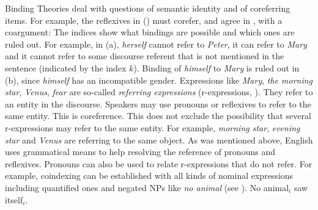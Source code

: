 \documentclass[output=paper,biblatex,babelshorthands,newtxmath,draftmode,colorlinks,citecolor=brown]{langscibook}
\begin{document}
Binding Theories deal with questions of semantic identity and  of coreferring
items. For example, the reflexives in () must corefer, and agree in , with a
coargument:
\eal
\label{ex-binding-reflexives}
\zl
The indices show what bindings are possible and which ones are ruled out. For example, in
(a), \emph{herself} cannot refer to \emph{Peter}, it can refer to \emph{Mary} and it cannot
refer to some discourse referent that is not mentioned in the sentence (indicated by the index
$k$). Binding of \emph{himself} to \emph{Mary} is ruled out in (b), since \emph{himself}
has an incompatible gender. Expressions like \emph{Mary}, \emph{the morning star}, \emph{Venus}, \emph{fear} are
so-called \emph{referring expressions} (r-expressions, \citealt[]{Chomsky81a}). They refer to an entity in the discourse. Speakers
may use pronouns or reflexives to refer to the same entity. This is coreference. This does not
exclude the possibility that several r-expressions may refer to the same entity. For example, \emph{morning star}, \emph{evening
  star} and \emph{Venus} are referring to the same object. As was mentioned above, English uses
grammatical means to help resolving the reference of pronouns and reflexives. Pronouns can also be
used to relate r-expressions that do not refer. For example, coindexing can be established with all kinds of nominal expressions including
quantified ones and negated NPs like \emph{no animal} (see \citealp[--129]{BP80a}).
\ea
No animal$_i$ saw itself$_i$.
\z
{}
\end{document}

